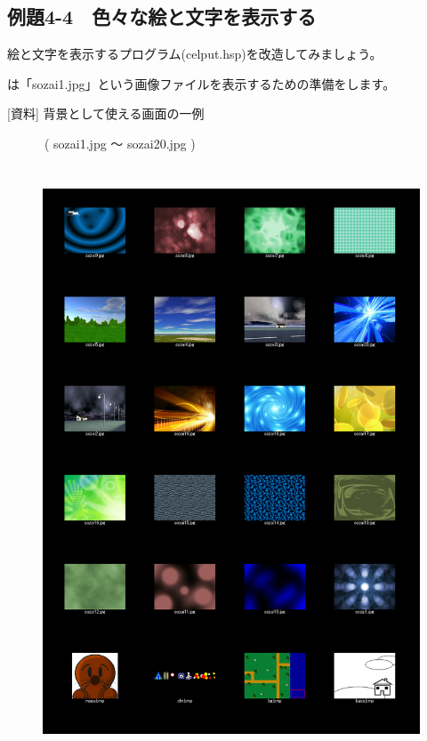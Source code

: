 \newpage
\subsection{例題4-4　色々な絵と文字を表示する}


\begin{description}
    \item {}
\end{description}

絵と文字を表示するプログラム(celput.hsp)を改造してみましょう。

\begin{description}
    \item {}
\end{description}


は「sozai1.jpg」という画像ファイルを表示するための準備をします。

[資料] 背景として使える画面の一例

　　　( sozai1.jpg 〜 sozai20.jpg )


\begin{figure}[H]
    \begin{center}
      \includegraphics[keepaspectratio,width=14.843cm,height=17.609cm]{text04-img/s_sozai.png}
    \end{center}
    \label{fig:prog_menu}
\end{figure}

